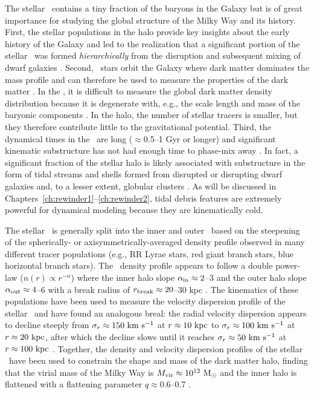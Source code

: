 The stellar \mwhalo\ contains a tiny fraction of the baryons in the Galaxy
\citep[$\approx$1\%;][]{bell08} but is of great importance for studying the
global structure of the Milky Way and its history. First, the stellar
populations in the halo provide key insights about the early history of the
Galaxy and led to the realization that a significant portion of the stellar
\mwhalo\ was formed \emph{hierarchically} from the disruption and subsequent
mixing of dwarf galaxies \citep[e.g.,][]{searle78, bullock05, bell08}. Second,
\mwhalo\ stars orbit the Galaxy where dark matter dominates the mass profile and
can therefore be used to measure the properties of the dark matter \mwhalo. In
the \mwdisk, it is difficult to measure the global dark matter density
distribution because it is degenerate with, e.g., the scale length and mass of
the baryonic components \citep{dehnen98a,sofue09}. In the halo, the number of
stellar tracers is smaller, but they therefore contribute little to the
gravitational potential. Third, the dynamical times in the \mwhalo\ are long
($\approx$0.5--1 Gyr or longer) and significant kinematic substructure has not
had enough time to phase-mix away \citep{helmi99}. In fact, a significant
fraction \citep[$\approx$40--50\%;][]{bell08} of the stellar halo is likely
associated with substructure in the form of tidal streams and shells formed from
disrupted or disrupting dwarf galaxies and, to a lesser extent, globular
clusters \citep[e.g.,][]{newberg02,majewski03,belokurov06}. As will be discussed
in Chapters~\ref{ch:rewinder1}--\ref{ch:rewinder2}, tidal debris features are
extremely powerful for dynamical modeling because they are kinematically cold.

The stellar \mwhalo\ is generally split into the inner and outer \mwhalo\ based
on the steepening of the spherically- or axisymmetrically-averaged density
profile observed in many different tracer populations (e.g., RR Lyrae stars, red
giant branch stars, blue horizontal branch stars). The \mwhalo\ density profile
appears to follow a double power-law ($n(r) \propto r^{-\alpha}$) where the
inner halo slope $\alpha_{\rm in} \approx 2$--3 and the outer halo slope
$\alpha_{\rm out} \approx 4$--6 with a break radius of $r_{\rm break} \approx
20$--30 kpc \citep{watkins09, sesar10, deason11, sesar11, sesar13a}. The
kinematics of these populations have been used to measure the velocity
dispersion profile of the stellar \mwhalo\ and have found an analogous
breal: the radial velocity dispersion appears to decline steeply from
$\sigma_r \approx 150~\mathrm{km}~\mathrm{s}^{-1}$ at $r\approx10~\mathrm{kpc}$ to $\sigma_r \approx 100~\mathrm{km}~\mathrm{s}^{-1}$
at $r\approx20~\mathrm{kpc}$, after which the decline slows until it reaches $\sigma_r
\approx 50~\mathrm{km}~\mathrm{s}^{-1}$ at $r\approx100~\mathrm{kpc}$ \citep{battaglia05, xue08, brown10,
deason12b, deason13}. Together, the density and velocity dispersion profiles of
the stellar \mwhalo\ have been used to constrain the shape and mass of the dark
matter halo, finding that the virial mass of the Milky Way is $M_{\rm vir}
\approx 10^{12}~\mathrm{M}_\odot$ and the inner halo is flattened with a flattening
parameter $q \approx 0.6$--0.7 \citep{sesar11, deason11, sesar13a, xue15}.

